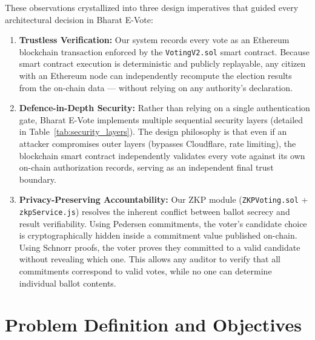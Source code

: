 \documentclass[oneside,a4paper,12pt]{book}
\begin{document}
These observations crystallized into three design imperatives that guided every architectural decision in Bharat E-Vote:
\begin{enumerate}[leftmargin=1.5cm]
    \item \textbf{Trustless Verification:} Our system records every vote as an Ethereum blockchain transaction enforced by the \texttt{VotingV2.sol} smart contract. Because smart contract execution is deterministic and publicly replayable, any citizen with an Ethereum node can independently recompute the election results from the on-chain data --- without relying on any authority's declaration.
    \item \textbf{Defence-in-Depth Security:} Rather than relying on a single authentication gate, Bharat E-Vote implements multiple sequential security layers (detailed in Table~\ref{tab:security_layers}). The design philosophy is that even if an attacker compromises outer layers (bypasses Cloudflare, rate limiting), the blockchain smart contract independently validates every vote against its own on-chain authorization records, serving as an independent final trust boundary.
    \item \textbf{Privacy-Preserving Accountability:} Our ZKP module (\texttt{ZKPVoting.sol} + \texttt{zkpService.js}) resolves the inherent conflict between ballot secrecy and result verifiability. Using Pedersen commitments, the voter's candidate choice is cryptographically hidden inside a commitment value published on-chain. Using Schnorr proofs, the voter proves they committed to a valid candidate without revealing which one. This allows any auditor to verify that all commitments correspond to valid votes, while no one can determine individual ballot contents.
\end{enumerate}

\section{Problem Definition and Objectives}
\end{document}
